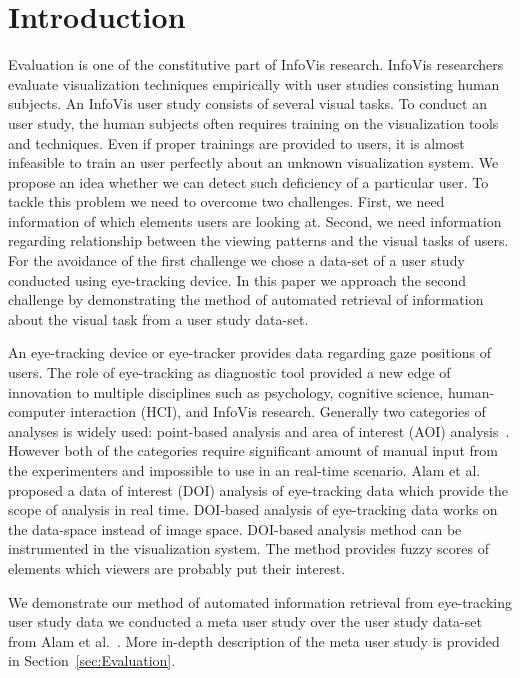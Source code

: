 \section{Introduction}

Evaluation is one of the constitutive part of InfoVis research. InfoVis researchers evaluate visualization techniques empirically with user studies consisting human subjects. An InfoVis user study consists of several visual tasks. To conduct an user study, the human subjects often requires training on the visualization tools and techniques. Even if proper trainings are provided to users, it is almost infeasible to train an user perfectly about an unknown visualization system. We propose an idea whether we can detect such deficiency of a particular user. To tackle this problem we need to overcome two challenges. First, we need information of which elements users are looking at. Second, we need information regarding relationship between the viewing patterns and the visual tasks of users. For the avoidance of the first challenge we chose a data-set of a user study conducted using eye-tracking device. In this paper we approach the second challenge by demonstrating the method of automated retrieval of information about the visual task from a user study data-set. 

An eye-tracking device or eye-tracker provides data regarding gaze positions of users. The role of eye-tracking as diagnostic tool provided a new edge of innovation to multiple disciplines such as psychology, cognitive science, human-computer interaction (HCI), and InfoVis research. Generally two categories of analyses is widely used: point-based analysis and area of interest (AOI) analysis~\cite{blascheckstate}. However both of the categories require significant amount of manual input from the experimenters and impossible to use in an real-time scenario. Alam et al.~\cite{alamdata} proposed a data of interest (DOI) analysis of eye-tracking data which provide the scope of analysis in real time. DOI-based analysis of eye-tracking data works on the data-space instead of image space. DOI-based analysis method can be instrumented in the visualization system. The method provides fuzzy scores of elements which viewers are probably put their interest. 

We demonstrate our method of automated information retrieval from eye-tracking user study data we conducted a meta user study over the user study data-set from Alam et al.~\cite{alamdata}. More in-depth description of the meta user study is provided in Section~\ref{sec:Evaluation}. 
